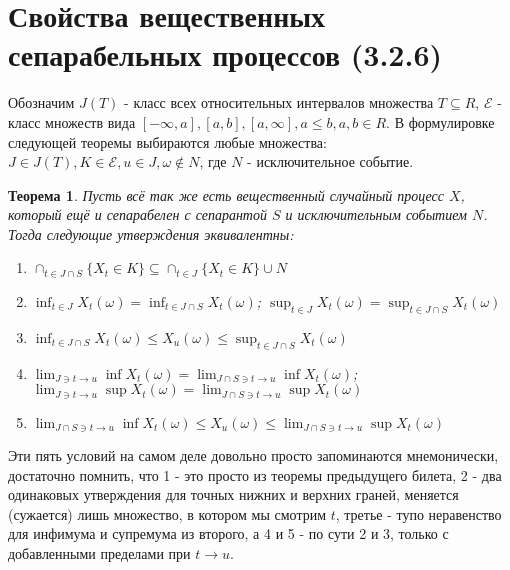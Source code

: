 \documentclass[16pt]{article}
\newtheorem{theorem}{Теорема}[section]
\theoremstyle{definition}
\begin{document}
\section{Свойства вещественных сепарабельных процессов (3.2.6)}
Обозначим $J(T)$ - класс всех относительных интервалов множества $T \subseteq R$, $\mathcal{E}$ - класс множеств вида $[-\infty, a], [a, b], [a, \infty], a \le b, a,b \in R$. В формулировке следующей теоремы выбираются любые множества: $J \in J(T), K \in \mathcal{E}, u \in J, \omega \notin N$, где $N$ - исключительное событие. 
\begin{theorem}
Пусть всё так же есть вещественный случайный процесс $X$, который ещё и сепарабелен с сепарантой $S$ и исключительным событием $N$. Тогда следующие утверждения эквивалентны:
\begin{enumerate}
    \item $\cap_{t \in J \cap S}\{X_t \in K\} \subseteq \cap_{t \in J}\{X_t \in K\} \cup N$
    \item $\inf_{t \in J}X_t(\omega) = \inf_{t \in J \cap S}X_t(\omega)$; \newline $\sup_{t \in J}X_t(\omega) = \sup_{t \in J \cap S}X_t(\omega)$
    \item $\inf_{t \in J \cap S}X_t(\omega) \le X_u(\omega) \le \sup_{t \in J \cap S}X_t(\omega)$
    \item $\lim_{J \ni t \rightarrow u} \inf X_t(\omega) = \lim_{J \cap S \ni t \rightarrow u} \inf X_t(\omega)$; \newline $\lim_{J \ni t \rightarrow u} \sup X_t(\omega) = \lim_{J \cap S \ni t \rightarrow u} \sup X_t(\omega)$
    \item $\lim_{J \cap S \ni t \rightarrow u} \inf X_t(\omega) \le X_u(\omega) \le \lim_{J \cap S \ni t \rightarrow u} \sup X_t(\omega)$
\end{enumerate}
\end{theorem}
Эти пять условий на самом деле довольно просто запоминаются мнемонически, достаточно помнить, что 1 - это просто из теоремы предыдущего билета, 2 - два одинаковых утверждения для точных нижних и верхних граней, меняется (сужается) лишь множество, в котором мы смотрим $t$, третье - тупо неравенство для инфимума и супремума из второго, а 4 и 5 - по сути 2 и 3, только с добавленными пределами при $t \rightarrow u$.
\end{document}
